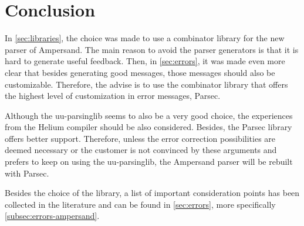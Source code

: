 
\section{Conclusion}
\label{sec:conclusion}
In \autoref{sec:libraries}, the choice was made to use a combinator library for the new parser of Ampersand.
The main reason to avoid the parser generators is that it is hard to generate useful feedback.
Then, in \autoref{sec:errors}, it was made even more clear that besides generating good messages, those messages should also be customizable.
Therefore, the advise is to use the combinator library that offers the highest level of customization in error messages, Parsec.

Although the uu-parsinglib seems to also be a very good choice, the experiences from the Helium compiler \cite{helium-parser} should be also considered.
Besides, the Parsec library offers better support.
Therefore, unless the error correction possibilities are deemed necessary or the customer is not convinced by these arguments and prefers to keep on using the uu-parsinglib, the Ampersand parser will be rebuilt with Parsec.

Besides the choice of the library, a list of important consideration points has been collected in the literature and can be found in \autoref{sec:errors}, more specifically \ref{subsec:errors-ampersand}.